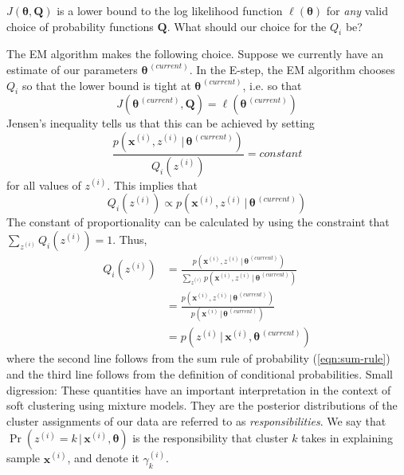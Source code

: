 \documentclass[final,3p,times,twocolumn]{elsarticle}
\let\bs\boldsymbol
\begin{document}
$J(\bs\theta,\bs Q)$ is a lower bound to the log likelihood function $\ell(\bs\theta)$ for \emph{any} valid choice of probability functions $\bs Q$.
What should our choice for the $Q_i$ be?

The EM algorithm makes the following choice.
Suppose we currently have an estimate of our parameters $\bs\theta^{\,(current)}$. 
In the E-step, the EM algorithm chooses $Q_i$ so that the lower bound is tight at $\bs\theta^{\,(current)}$, i.e. so that
\begin{equation}
J\left(\bs\theta^{\,(current)},\bs Q\right) = \ell\left(\bs\theta^{\,(current)}\right)
\end{equation}
Jensen's inequality tells us that this can be achieved by setting 
\begin{equation}
\frac{p(\bs x^{(i)},z^{(i)}\,|\,\bs \theta^{\,(current)})}{Q_i(z^{(i)})} = constant
\end{equation}
for all values of $z^{(i)}$.
This implies that
\begin{equation}
Q_i(z^{(i)}) \propto p(\bs x^{(i)},z^{(i)}\,|\,\bs\theta^{\,(current)})
\end{equation}
The constant of proportionality can be calculated by using the constraint that $\sum_{z^{(i)}} Q_i(z^{(i)}) = 1$.
Thus,
\begin{equation}
\label{eqn:EM-E}
\begin{split}
Q_i(z^{(i)}) &= \frac{p(\bs x^{(i)},z^{(i)}\,|\,\bs\theta^{\,(current)})}{\sum_{z^{(i)}}p(\bs x^{(i)},z^{(i)}\,|\,\bs\theta^{\,(current)})}\\
&= \frac{p(\bs x^{(i)},z^{(i)}\,|\,\bs\theta^{\,(current)})}{p(\bs x^{(i)}\,|\,\bs\theta^{\,(current)})}\\
&= p(z^{(i)}\,|\,\bs x^{(i)},\bs\theta^{\,(current)})
\end{split}
\end{equation}
where the second line follows from the sum rule of probability (\ref{eqn:sum-rule}) and the third line follows from the definition of conditional probabilities.
Small digression: These quantities have an important interpretation in the context of soft clustering using mixture models.
They are the posterior distributions of the cluster assignments of our data are referred to as \emph{responsibilities}.
We say that $\Pr(z^{(i)} = k\,|\,\bs x^{(i)},\bs\theta)$ is the responsibility that cluster $k$ takes in explaining sample $\bs x^{(i)}$, and denote it $\gamma_k^{(i)}$.
\end{document}
